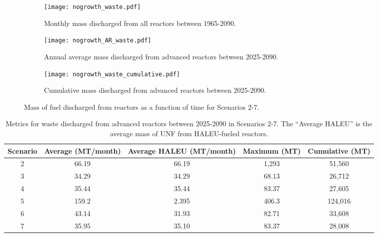 \begin{figure}[h!]
    \centering
    \begin{subfigure}[b]{0.45\textwidth}
        \centering
        \texttt{[image: nogrowth\_waste.pdf]}
        \caption{Monthly mass discharged from all reactors 
        between 1965-2090.}
        \label{fig:nogrowth_all_waste}
    \end{subfigure}
    \hfill
    \begin{subfigure}[b]{0.45\textwidth}
        \centering
        \texttt{[image: nogrowth\_AR\_waste.pdf]}
        \caption{Annual average mass discharged from 
        advanced reactors between 2025-2090.}
        \label{fig:nogrowth_AR_waste}
    \end{subfigure}
    \begin{subfigure}[b]{0.45\textwidth}
        \centering
        \texttt{[image: nogrowth\_waste\_cumulative.pdf]}
        \caption{Cumulative mass discharged from advanced reactors 
        between 2025-2090.}
        \label{fig:nogrowth_waste_cumulative}
    \end{subfigure}
       \caption{Mass of fuel discharged from reactors 
       as a function of time for Scenarios 2-7. }
       \label{fig:nogrowth_waste}
\end{figure}

\begin{table}[h!]
    \centering 
    \caption{Metrics for waste discharged from advanced reactors 
    between 2025-2090 in Scenarios 2-7. The ``Average \gls{HALEU}''
    is the average mass of \gls{UNF} from \gls{HALEU}-fueled 
    reactors. }
    \label{tab:nogrowth_waste}
    \begin{tabular}{c c c c c}
        \hline
        Scenario & Average (MT/month) & Average \gls{HALEU}
        (MT/month) & Maximum (MT) & Cumulative (MT)\\\hline
        2 & 66.19 & 66.19 & 1,293 & 51,560\\
        3 & 34.29 & 34.29 & 68.13 & 26,712\\
        4 & 35.44 & 35.44 & 83.37 & 27,605\\
        5 & 159.2 & 2.395 & 406.3 & 124,016\\
        6 & 43.14 & 31.93 & 82.71 & 33,608\\
        7 & 35.95 & 35.10 & 83.37 & 28,008\\
        \hline
    \end{tabular}
\end{table}

